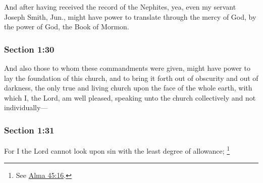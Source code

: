 		And after having received the record of the Nephites, yea, even my servant Joseph Smith, Jun., might have power to translate through the mercy of God, by the power of God, the Book of Mormon.


	\subsubsection{Section 1:30} %
		\label{DC1-30}

		And also those to whom these commandments were given, might have power to lay the foundation of this church, and to bring it forth out of obscurity and out of darkness, the only true and living church upon the face of the whole earth, with which I, the Lord, am well pleased, speaking unto the church collectively and not individually---


	\subsubsection{Section 1:31} %
		\label{DC1-31}

		For I the Lord cannot look upon sin with the least degree of allowance;%
			\footnote{%
				See \hyperref[ALMA-45-16]{Alma 45:16}.
				}


